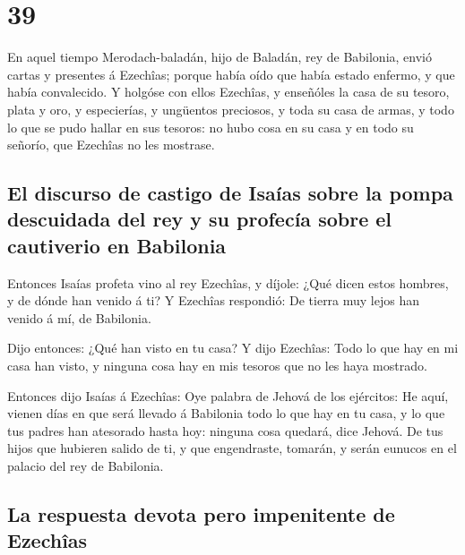 \hypertarget{section-38}{%
\section{39}\label{section-38}}

 En aquel tiempo Merodach-baladán, hijo de Baladán, rey de
Babilonia, envió cartas y presentes á Ezechîas; porque había oído que
había estado enfermo, y que había convalecido.  Y holgóse
con ellos Ezechîas, y enseñóles la casa de su tesoro, plata y oro, y
especierías, y ungüentos preciosos, y toda su casa de armas, y todo lo
que se pudo hallar en sus tesoros: no hubo cosa en su casa y en todo su
señorío, que Ezechîas no les mostrase.

\hypertarget{el-discurso-de-castigo-de-isauxedas-sobre-la-pompa-descuidada-del-rey-y-su-profecuxeda-sobre-el-cautiverio-en-babilonia}{%
\subsection{El discurso de castigo de Isaías sobre la pompa descuidada
del rey y su profecía sobre el cautiverio en
Babilonia}\label{el-discurso-de-castigo-de-isauxedas-sobre-la-pompa-descuidada-del-rey-y-su-profecuxeda-sobre-el-cautiverio-en-babilonia}}

 Entonces Isaías profeta vino al rey Ezechîas, y díjole:
¿Qué dicen estos hombres, y de dónde han venido á ti? Y Ezechîas
respondió: De tierra muy lejos han venido á mí, de Babilonia.

 Dijo entonces: ¿Qué han visto en tu casa? Y dijo Ezechîas:
Todo lo que hay en mi casa han visto, y ninguna cosa hay en mis tesoros
que no les haya mostrado.

 Entonces dijo Isaías á Ezechîas: Oye palabra de Jehová de
los ejércitos:  He aquí, vienen días en que será llevado á
Babilonia todo lo que hay en tu casa, y lo que tus padres han atesorado
hasta hoy: ninguna cosa quedará, dice Jehová.  De tus hijos
que hubieren salido de ti, y que engendraste, tomarán, y serán eunucos
en el palacio del rey de Babilonia.

\hypertarget{la-respuesta-devota-pero-impenitente-de-ezechuxeeas}{%
\subsection{La respuesta devota pero impenitente de
Ezechîas}\label{la-respuesta-devota-pero-impenitente-de-ezechuxeeas}}

